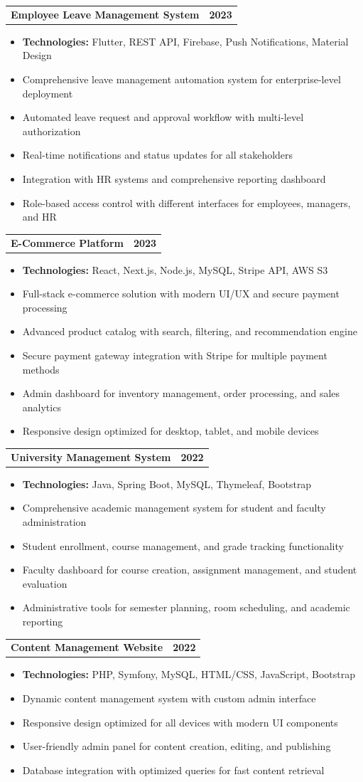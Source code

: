 \documentclass[letterpaper,11pt]{article}
\makeatletter
\newcommand{\resumeItem}[1]{
  \item\small{#1 \vspace{1pt}}
}
\newcommand{\resumeProjectHeading}[2]{
    \item
    \begin{tcolorbox}[
      colback=white,
      colframe=accent,
      boxrule=0.5pt,
      arc=3pt,
      left=6pt,
      right=6pt,
      top=3pt,
      bottom=3pt
    ]
      \begin{tabular*}{\textwidth}{l@{\extracolsep{\fill}}r}
        \textbf{\color{darkgray}#1} & \textbf{\small \color{mediumgray}#2}\\
      \end{tabular*}
    \end{tcolorbox}
    \vspace{-6pt}
}
\newcommand{\resumeItemListStart}{\begin{itemize}[leftmargin=0.15in]}
\newcommand{\resumeItemListEnd}{\end{itemize}\vspace{2pt}}
\makeatother
\begin{document}
  \resumeProjectHeading
    {\textbf{Employee Leave Management System}}{2023}
    \resumeItemListStart
      \resumeItem{\textbf{Technologies:} Flutter, REST API, Firebase, Push Notifications, Material Design}
      \resumeItem{Comprehensive leave management automation system for enterprise-level deployment}
      \resumeItem{Automated leave request and approval workflow with multi-level authorization}
      \resumeItem{Real-time notifications and status updates for all stakeholders}
      \resumeItem{Integration with HR systems and comprehensive reporting dashboard}
      \resumeItem{Role-based access control with different interfaces for employees, managers, and HR}
    \resumeItemListEnd

  \resumeProjectHeading
    {\textbf{E-Commerce Platform}}{2023}
    \resumeItemListStart
      \resumeItem{\textbf{Technologies:} React, Next.js, Node.js, MySQL, Stripe API, AWS S3}
      \resumeItem{Full-stack e-commerce solution with modern UI/UX and secure payment processing}
      \resumeItem{Advanced product catalog with search, filtering, and recommendation engine}
      \resumeItem{Secure payment gateway integration with Stripe for multiple payment methods}
      \resumeItem{Admin dashboard for inventory management, order processing, and sales analytics}
      \resumeItem{Responsive design optimized for desktop, tablet, and mobile devices}
    \resumeItemListEnd

  \resumeProjectHeading
    {\textbf{University Management System}}{2022}
    \resumeItemListStart
      \resumeItem{\textbf{Technologies:} Java, Spring Boot, MySQL, Thymeleaf, Bootstrap}
      \resumeItem{Comprehensive academic management system for student and faculty administration}
      \resumeItem{Student enrollment, course management, and grade tracking functionality}
      \resumeItem{Faculty dashboard for course creation, assignment management, and student evaluation}
      \resumeItem{Administrative tools for semester planning, room scheduling, and academic reporting}
    \resumeItemListEnd

  \resumeProjectHeading
    {\textbf{Content Management Website}}{2022}
    \resumeItemListStart
      \resumeItem{\textbf{Technologies:} PHP, Symfony, MySQL, HTML/CSS, JavaScript, Bootstrap}
      \resumeItem{Dynamic content management system with custom admin interface}
      \resumeItem{Responsive design optimized for all devices with modern UI components}
      \resumeItem{User-friendly admin panel for content creation, editing, and publishing}
      \resumeItem{Database integration with optimized queries for fast content retrieval}
    \resumeItemListEnd
\end{document}
